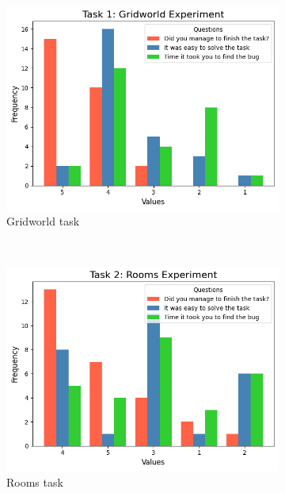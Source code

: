\begin{figure}[hptb]
    \centering
    \begin{subfigure}[b]{0.32\textwidth}
        \centering
        \includegraphics[width=\textwidth]{figures/task1}
        \caption{Gridworld task}
        \label{fig:task1}
    \end{subfigure}
    ~ 
    \begin{subfigure}[b]{0.32\textwidth}
        \centering
        \includegraphics[width=\textwidth]{figures/task2}
        \caption{Rooms task}
        \label{fig:task2}
    \end{subfigure}
    ~ 
    \begin{subfigure}[b]{0.32\textwidth}
        \centering

\end{subfigure}
\end{figure}
